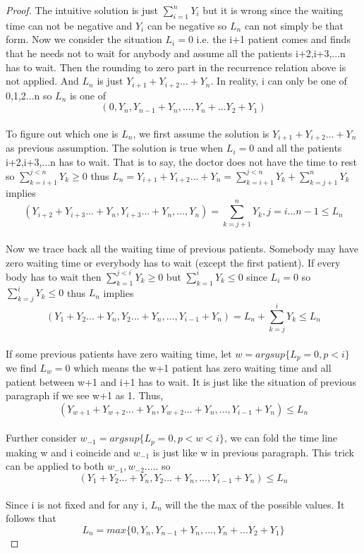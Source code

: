 \documentclass[project2.tex]{subfiles}
\begin{document}
\begin{proof}
The intuitive solution is just $\sum_{i=1}^nY_i$ but it is wrong since the waiting time can not be negative and $Y_i$ can be negative so $L_n$ can not simply be that form. Now we consider the situation $L_i=0$ i.e. the i+1 patient comes and finds that he needs not to wait for anybody and assume all the patients i+2,i+3,...n has to wait. Then the rounding to zero part in the recurrence relation above is not applied. And $L_n$ is  just $Y_{i+1}+Y_{i+2}...+Y_n$. In reality, i can only be one of 0,1,2...n so $L_n$ is one of $$(0,Y_n,Y_{n-1}+Y_n,...,Y_n+...Y_2+Y_1)$$
\paragraph{}
To figure out which one is $L_n$, we first assume the solution is $Y_{i+1}+Y_{i+2}...+Y_n$ as previous assumption. The solution is true when $L_i=0$ and all the patients i+2,i+3,...n has to wait. That is to say, the doctor does not have the time to rest so $\sum_{k=i+1}^{j<n}Y_k\geq 0$ thus $L_n=Y_{i+1}+Y_{i+2}...+Y_n=\sum_{k=i+1}^{j<n}Y_k+\sum_{k=j+1}^{n}Y_k$ implies $$(Y_{i+2}+Y_{i+3}...+Y_n,Y_{i+3}...+Y_n,...,Y_n)=\sum_{k=j+1}^{n}Y_k,j=i...n-1\leq L_n$$
\paragraph{}
Now we trace back all the waiting time of previous patients. Somebody may have zero waiting time or everybody has to wait (except the first patient). If every body has to wait then $\sum_{k=1}^{j<i}Y_k\geq 0$ but $\sum_{k=1}^{i}Y_k\leq 0$ since $L_i=0$ so $\sum_{k=j}^{i}Y_k\leq 0$ thus $L_n$ implies $$(Y_{1}+Y_{2}...+Y_n,Y_{2}...+Y_n,...,Y_{i-1}+Y_n)=L_n+\sum_{k=j}^{i}Y_k\leq L_n$$ 
\paragraph{}
If some previous patients have zero waiting time, let $w=argsup\{L_p=0,p<i\}$ we find $L_w=0$ which means the w+1 patient has zero waiting time and all patient between w+1 and i+1 has to wait. It is just like the situation of  previous  paragraph if we see w+1 as 1. Thus, $$(Y_{w+1}+Y_{w+2}...+Y_n,Y_{w+2}...+Y_n,...,Y_{i-1}+Y_n)\leq L_n$$
\paragraph{}
Further consider $w_{-1}=argsup\{L_p=0,p<w<i\}$, we can fold the time line making w and i coincide and $w_{-1}$ is just like w in previous paragraph. This trick can be applied to both $w_{-1},w_{-2}.....$ so $$(Y_{1}+Y_{2}...+Y_n,Y_{2}...+Y_n,...,Y_{i-1}+Y_n)\leq L_n$$
\paragraph{}
Since i is not fixed and for any i, $L_n$ will the the max of the possible values. It follows that 
$$L_n=max\{0,Y_n,Y_{n-1}+Y_n,...,Y_n+...Y_2+Y_1\}$$
\end{proof} 
\end{document}
